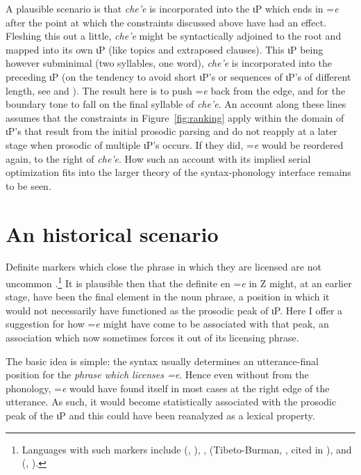 \documentclass[output=paper,
modfonts
]{LSP/langsci}
\begin{document}
A plausible scenario is that \emph{che'e} is incorporated into the ιP which ends in =\emph{e} after the point
at which the constraints discussed above have had an effect.
Fleshing this out a little, \emph{che'e} might be syntactically adjoined to the root and mapped into its own ιP (like topics and
extraposed clauses). This ιP being however subminimal (two syllables, one word), \emph{che'e} is incorporated into the preceding ιP
(on the tendency to avoid short ιP's or sequences of ιP's of different length, see \citealt{nesporvogel1986} and \citealt{dehe2009}).
 The result here is to push =\emph{e} back from the edge, and for the boundary tone to fall on the final syllable of \emph{che'e}.  
 An account along these lines assumes
 that the constraints in Figure~\ref{fig:ranking} apply within the domain of  ιP's that result from the initial 
 prosodic parsing and do not reapply at a later stage when prosodic  of multiple ιP's occurs.
 If they did, =\emph{e} would be reordered again, to the right of \emph{che'e}. How such an account with
 its implied serial optimization fits into the larger theory of the syntax-phonology interface remains to be seen.

\section{An historical scenario}
Definite markers which close the phrase in which they are licensed are not uncommon \citep{wals-37}.\footnote
{Languages with such markers include  (,  \citealt{torrence2013}),  \citep{laka1996},  (Tibeto-Burman, \citealt{Giridhar-1980}, cited in \citealt{wals-37}), and  (, \citealt{stirtz2012}).
} 
  It is plausible then that the definite en =\emph{e} in Z  might, at an earlier stage, have been the final element in the noun
  phrase, a position in which it would not necessarily have functioned as the prosodic peak of ιP.
  Here I offer a suggestion for how =\emph{e} might have come to be associated with that peak, an association
  which now sometimes forces it out of its licensing phrase.
 
The basic idea is simple:  the syntax usually determines an utterance-final position 
for the \emph{phrase which licenses =\emph{e}}. Hence even without  from the phonology,  
=\emph{e} would have found itself in most cases at the right edge of the utterance.
As such, it would become statistically associated with the prosodic peak of the ιP 
 and this could have been reanalyzed as a lexical property.  
\end{document}
